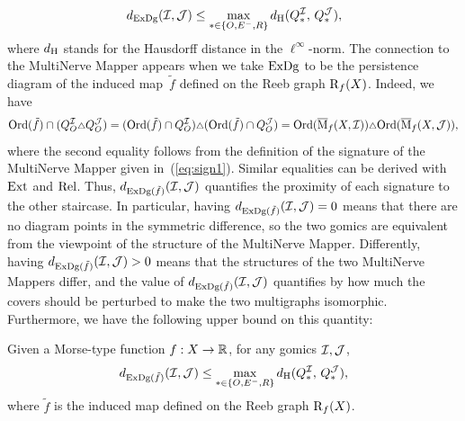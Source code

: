 \[%
d_{\Dg}(\I, \J) \leq \max_{*\in \{O, {E^-}, R\}} \disth(Q_*^{\I},\, Q_*^{\J}),
\]%
%
where $d_{\rm H}$ stands for the Hausdorff distance in the $\ell^\infty$-norm.
%
The connection to the MultiNerve Mapper appears when we take $\mathrm{ExDg}$ to be the
persistence diagram of the induced map~$\tilde f$ defined on the Reeb
graph $\mathrm{R}_f(X)$. Indeed, we have
%
\[
\mathrm{Ord}(\tilde f)\cap (Q_O^{\mathcal{I}} {\scriptstyle\triangle} Q_O^{\mathcal{J}}) = (\mathrm{Ord}(\tilde f)\cap Q_O^{\mathcal{I}}) {\scriptstyle\triangle}
(\mathrm{Ord}(\tilde f)\cap Q_O^{\mathcal{J}}) = \mathrm{Ord}(\overline{\mathrm{M}}_f(X,\mathcal{I})) {\scriptstyle\triangle}
\mathrm{Ord}(\overline{\mathrm{M}}_f(X,\mathcal{J})),
\]
%
where the second equality follows from the definition of the
signature of the MultiNerve Mapper given in~(\ref{eq:sign1}). 
Similar equalities can be derived with $\mathrm{Ext}$ and $\mathrm{Rel}$. Thus,
$d_{\mathrm{ExDg}(\tilde f)}(\mathcal{I}, \mathcal{J})$ quantifies the proximity of each
signature to the other staircase.  In particular, having
$d_{\mathrm{ExDg}(\tilde f)}(\mathcal{I}, \mathcal{J}) = 0$ means that there are no diagram points
in the symmetric difference, so the two gomics are equivalent from the
viewpoint of the structure of the MultiNerve Mapper. Differently,
having $d_{\mathrm{ExDg}(\tilde f)}(\mathcal{I}, \mathcal{J}) > 0$ means that the structures of
the two MultiNerve Mappers differ, and the value of $d_{\mathrm{ExDg}(\tilde
  f)}(\mathcal{I}, \mathcal{J})$ quantifies by how much the covers should be perturbed
to make the two multigraphs isomorphic. Furthermore,
we have the following upper bound on this quantity:
%
\begin{thm}\label{thm:CStab} 
Given a Morse-type function $f:X\to\mathbb{R}$, for any gomics $\mathcal{I}, \mathcal{J}$,
%
\[
d_{\mathrm{ExDg}(\tilde f)}(\mathcal{I}, \mathcal{J}) \leq  \max_{*\in \{O, {E^-}, R\}} d_{\rm H}(Q_*^{\mathcal{I}},\, Q_*^{\mathcal{J}}),
\]
%
where $\tilde f$ is the induced map defined on the Reeb graph $\mathrm{R}_f(X)$.
\end{thm}
%
